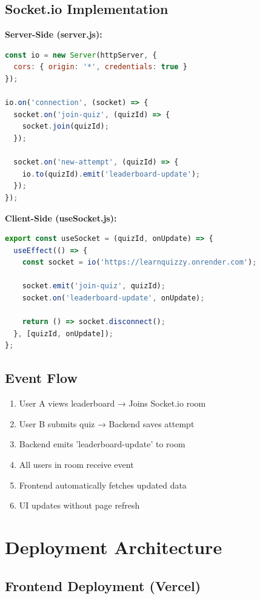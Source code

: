 \documentclass[12pt,a4paper]{article}
\begin{document}
\subsection{Socket.io Implementation}

\textbf{Server-Side (server.js):}
\begin{lstlisting}[language=JavaScript]
const io = new Server(httpServer, {
  cors: { origin: '*', credentials: true }
});

io.on('connection', (socket) => {
  socket.on('join-quiz', (quizId) => {
    socket.join(quizId);
  });
  
  socket.on('new-attempt', (quizId) => {
    io.to(quizId).emit('leaderboard-update');
  });
});
\end{lstlisting}

\textbf{Client-Side (useSocket.js):}
\begin{lstlisting}[language=JavaScript]
export const useSocket = (quizId, onUpdate) => {
  useEffect(() => {
    const socket = io('https://learnquizzy.onrender.com');
    
    socket.emit('join-quiz', quizId);
    socket.on('leaderboard-update', onUpdate);
    
    return () => socket.disconnect();
  }, [quizId, onUpdate]);
};
\end{lstlisting}

\subsection{Event Flow}
\begin{enumerate}
    \item User A views leaderboard → Joins Socket.io room
    \item User B submits quiz → Backend saves attempt
    \item Backend emits 'leaderboard-update' to room
    \item All users in room receive event
    \item Frontend automatically fetches updated data
    \item UI updates without page refresh
\end{enumerate}

\newpage

\section{Deployment Architecture}

\subsection{Frontend Deployment (Vercel)}
\end{document}
